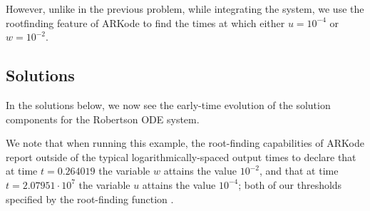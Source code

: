 \documentclass[letterpaper,10pt,english]{sphinxmanual}
\begin{document}
However, unlike in the previous problem, while integrating the system,
we use the rootfinding feature of ARKode to find the times at which
either \(u=10^{-4}\) or \(w=10^{-2}\).


\subsection{Solutions}
\label{c_serial:id15}
In the solutions below, we now see the early-time evolution of the
solution components for the Robertson ODE system.
\begin{figure}[htbp]
\centering

\end{figure}

We note that when running this example, the root-finding capabilities
of ARKode report outside of the typical logarithmically-spaced output
times to declare that at time \(t=0.264019\) the variable
\(w\) attains the value \(10^{-2}\), and that at time
\(t=2.07951\cdot10^{7}\) the variable \(u\) attains the value
\(10^{-4}\); both of our thresholds specified by the root-finding
function .
\end{document}

